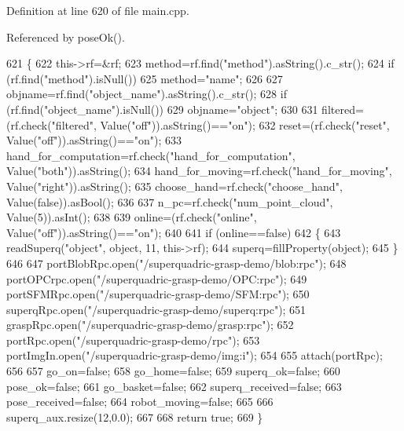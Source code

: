 Definition at line 620 of file main.\+cpp.



Referenced by pose\+Ok().


\begin{DoxyCode}
621     \{
622         this->rf=&rf;
623         method=rf.find(\textcolor{stringliteral}{"method"}).asString().c\_str();
624         \textcolor{keywordflow}{if} (rf.find(\textcolor{stringliteral}{"method"}).isNull())
625             method=\textcolor{stringliteral}{"name"};
626 
627         objname=rf.find(\textcolor{stringliteral}{"object\_name"}).asString().c\_str();
628         \textcolor{keywordflow}{if} (rf.find(\textcolor{stringliteral}{"object\_name"}).isNull())
629             objname=\textcolor{stringliteral}{"object"};
630 
631         filtered=(rf.check(\textcolor{stringliteral}{"filtered"}, Value(\textcolor{stringliteral}{"off"})).asString()==\textcolor{stringliteral}{"on"});
632         reset=(rf.check(\textcolor{stringliteral}{"reset"}, Value(\textcolor{stringliteral}{"off"})).asString()==\textcolor{stringliteral}{"on"});
633         hand\_for\_computation=rf.check(\textcolor{stringliteral}{"hand\_for\_computation"}, Value(\textcolor{stringliteral}{"both"})).asString();
634         hand\_for\_moving=rf.check(\textcolor{stringliteral}{"hand\_for\_moving"}, Value(\textcolor{stringliteral}{"right"})).asString();
635         choose\_hand=rf.check(\textcolor{stringliteral}{"choose\_hand"}, Value(\textcolor{keyword}{false})).asBool();
636 
637         n\_pc=rf.check(\textcolor{stringliteral}{"num\_point\_cloud"}, Value(5)).asInt();
638 
639         online=(rf.check(\textcolor{stringliteral}{"online"}, Value(\textcolor{stringliteral}{"off"})).asString()==\textcolor{stringliteral}{"on"});
640 
641         \textcolor{keywordflow}{if} (online==\textcolor{keyword}{false})
642         \{
643             readSuperq(\textcolor{stringliteral}{"object"}, \textcolor{keywordtype}{object}, 11, this->rf);
644             superq=fillProperty(\textcolor{keywordtype}{object});
645         \}
646 
647         portBlobRpc.open(\textcolor{stringliteral}{"/superquadric-grasp-demo/blob:rpc"});
648         portOPCrpc.open(\textcolor{stringliteral}{"/superquadric-grasp-demo/OPC:rpc"});
649         portSFMRpc.open(\textcolor{stringliteral}{"/superquadric-grasp-demo/SFM:rpc"});
650         superqRpc.open(\textcolor{stringliteral}{"/superquadric-grasp-demo/superq:rpc"});
651         graspRpc.open(\textcolor{stringliteral}{"/superquadric-grasp-demo/grasp:rpc"});
652         portRpc.open(\textcolor{stringliteral}{"/superquadric-grasp-demo/rpc"});
653         portImgIn.open(\textcolor{stringliteral}{"/superquadric-grasp-demo/img:i"});
654 
655         attach(portRpc);
656 
657         go\_on=\textcolor{keyword}{false};
658         go\_home=\textcolor{keyword}{false};
659         superq\_ok=\textcolor{keyword}{false};
660         pose\_ok=\textcolor{keyword}{false};
661         go\_basket=\textcolor{keyword}{false};
662         superq\_received=\textcolor{keyword}{false};
663         pose\_received=\textcolor{keyword}{false};
664         robot\_moving=\textcolor{keyword}{false};
665 
666         superq\_aux.resize(12,0.0);
667 
668         \textcolor{keywordflow}{return}  \textcolor{keyword}{true};
669     \}
\end{DoxyCode}
